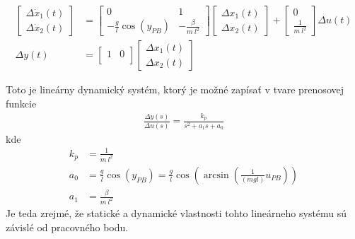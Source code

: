 \documentclass[a4paper, 10pt, ]{article}
\begin{document}
\begin{subequations} \label{stavoplinkyv}
    \begin{align}
    	\begin{bmatrix}
        	  \Delta \dot x_1(t) \\
    		  \Delta \dot x_2(t)
     	\end{bmatrix}
    	&=
    	\begin{bmatrix}
        	0 & 1 \\
        	- \frac{g}{l} \cos \left( y_{PB} \right) & - \frac{\beta}{m\ l^2}
      	\end{bmatrix}
        \begin{bmatrix}
        	  \Delta x_1(t) \\
    		  \Delta x_2(t)
     	\end{bmatrix}
        +
        \begin{bmatrix}
        	  0 \\
    		  \frac{1}{m\ l^2}
     	\end{bmatrix}
        \Delta u(t)
        \\
        \Delta y(t)
        &=
        \begin{bmatrix}
            1 & 0 \\
        \end{bmatrix}
        \begin{bmatrix}
              \Delta x_1(t) \\
              \Delta x_2(t)
        \end{bmatrix}
    \end{align}
\end{subequations}


Toto je lineárny dynamický systém, ktorý je možné zapísať v tvare prenosovej funkcie
\begin{align}
    \frac{\Delta y(s)}{\Delta u(s)} = \frac{k_p}{s^2 + a_1 s + a_0}
\end{align}
kde
\begin{subequations}
    \begin{align}
        k_p &= \frac{1}{m\ l^2} \\
        a_0 &= \frac{g}{l} \cos \left( y_{PB} \right) = \frac{g}{l} \cos \left( \arcsin \left( \frac{1}{ \left(m g l\right)} u_{PB} \right) \right) \\
        a_1 &= \frac{\beta}{m\ l^2}
    \end{align}
\end{subequations}
Je teda zrejmé, že statické a dynamické vlastnosti tohto lineárneho systému sú závislé od pracovného bodu.
\end{document}
